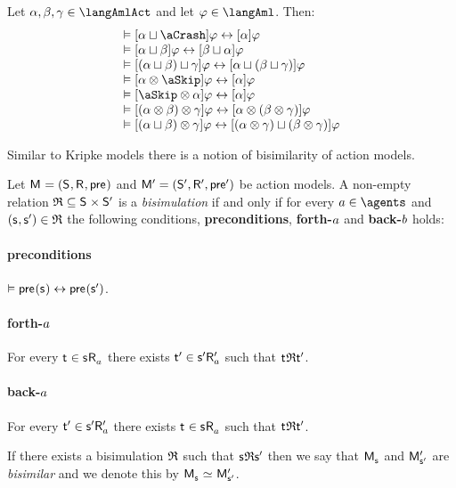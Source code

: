 \begin{proposition}
Let $\alpha, \beta, \gamma \in \langAmlAct$ and let $\phi \in \langAml$. Then:
$$
\begin{array}{l}
    \entails \actionA{\alpha \choice \aCrash} \phi \iff \actionA{\alpha} \phi\\
    \entails \actionA{\alpha \choice \beta} \phi \iff \actionA{\beta \choice \alpha} \phi\\
    \entails \actionA{(\alpha \choice \beta) \choice \gamma} \phi \iff \actionA{\alpha \choice (\beta \choice \gamma)} \phi\\
    \entails \actionA{\alpha \compose \aSkip} \phi \iff \actionA{\alpha} \phi\\
    \entails \actionA{\aSkip \compose \alpha} \phi \iff \actionA{\alpha} \phi\\
    \entails \actionA{(\alpha \compose \beta) \compose \gamma} \phi \iff \actionA{\alpha \compose (\beta \compose \gamma)} \phi\\
    \entails \actionA{(\alpha \choice \beta) \compose \gamma} \phi \iff \actionA{(\alpha \compose \gamma) \choice (\beta \compose \gamma)} \phi
\end{array}
$$
\end{proposition}

Similar to Kripke models there is a notion of bisimilarity of action models.

\begin{definition}
Let $\aModelAndTuple$ and $\aModelAndTupleP$ be action models.
A non-empty relation $\bisimulation \subseteq \aStates \times \aStatesP$ is a {\em bisimulation} if and only if for every $\agentA \in \agents$ and $(\aStateS, \aStateSP) \in \bisimulation$ the following conditions, {\bf preconditions}, {\bf forth-$a$} and {\bf back-$b$} holds:

\paragraph{preconditions}
$\entails \aPrecondition(\aStateS) \iff \aPrecondition(\aStateSP)$.

\paragraph{forth-$a$}
For every $\aStateT \in \aSuccessorsA{\aStateS}$ there exists ${\mathsf{{t}}^{\prime}} \in {{\mathsf{{s}}^{\prime}}} {\mathsf{R}^{\prime}_{a}}$ such that $\aStateT \bisimulation \aStateTP$.

\paragraph{back-$a$}
For every ${\mathsf{{t}}^{\prime}} \in {{\mathsf{{s}}^{\prime}}} {\mathsf{R}^{\prime}_{a}}$ there exists $\aStateT \in \aSuccessorsA{\aStateS}$ such that $\aStateT \bisimulation \aStateTP$.

If there exists a bisimulation $\mathfrak{R}$ such that $\aStateS \bisimulation \aStateSP$ then we say that $\aPModel{\aStateS}$ and ${\mathsf{M}^{\prime}_{{\mathsf{{s}}^{\prime}}}}$ are {\em bisimilar} and we denote this by $\aPModel{\aStateS} \bisimilar \aPModelP{\aStateSP}$.
\end{definition}

